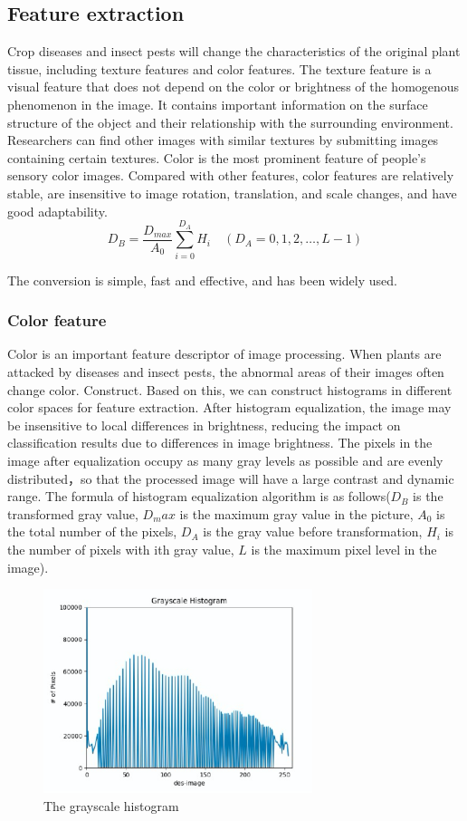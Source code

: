 \documentclass[11pt,en]{elegantpaper}
\begin{document}
\subsection{Feature extraction}
Crop diseases and insect pests will change the characteristics of the original plant tissue, including texture features and color features. The texture feature is a visual feature that does not depend on the color or brightness of the homogenous phenomenon in the image. It contains important information on the surface structure of the object and their relationship with the surrounding environment. Researchers can find other images with similar textures by submitting images containing certain textures. Color is the most prominent feature of people's sensory color images. Compared with other features, color features are relatively stable, are insensitive to image rotation, translation, and scale changes, and have good adaptability\cite{mohanty2016using}.
$$D_{B}=\frac{D_{max} }{A_{0}} \sum_{i=0}^{D_{A}} H_{i} \quad\left(D_{A}=0,1,2, \ldots, L-1\right)$$

The conversion is simple, fast and effective, and has been widely used.
\subsubsection{Color feature}
Color is an important feature descriptor of image processing. When plants are attacked by diseases and insect pests, the abnormal areas of their images often change color. Construct. Based on this, we can construct histograms in different color spaces for feature extraction. After histogram equalization, the image may be insensitive to local differences in brightness, reducing the impact on classification results due to differences in image brightness. The pixels in the image after equalization occupy as many gray levels as possible and are evenly distributed，so that the processed image will have a large contrast and dynamic range\cite{guo2017color}. The formula of histogram equalization algorithm is as follows($D_B$ is the transformed gray value, $D_max$ is the maximum gray value in the picture, $A_0$ is the total number of the pixels, $D_A$ is the gray value before transformation, $H_i$ is the number of pixels with ith gray value, $L$ is the maximum pixel level in the image). 
\begin{figure}[h]
	\centering
	\includegraphics[width=0.7\textwidth]{figure/grayscalehistogram}
	\caption{The grayscale histogram}
\end{figure}
\end{document}
